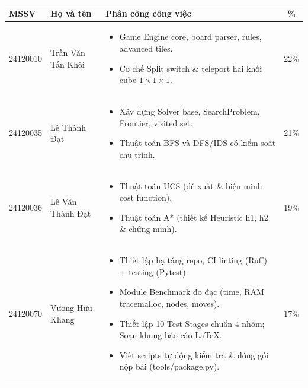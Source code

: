 \begin{table}[H]
    \centering
    \renewcommand{\arraystretch}{1.3}
    \setlength{\tabcolsep}{6pt}
    \setlength{\arrayrulewidth}{1pt}

    \begin{tabularx}{\textwidth}{|p{2cm}|p{4cm}|X|c|}
        \hline
        \rowcolor[rgb]{0.8, 0.9, 1.0}
        \textbf{MSSV} & \textbf{Họ và tên} & \textbf{Phân công công việc} & \textbf{\%} \\ \hline

        24120010 & Trần Văn Tấn Khôi &
        \vspace{-0.5\baselineskip}
        \begin{itemize}[itemsep=0pt, topsep=0pt, partopsep=0pt, parsep=0pt]
            \item Game Engine core, board parser, rules, advanced tiles.
            \item Cơ chế Split switch \& teleport hai khối cube $1 \times 1 \times 1$.
        \end{itemize} & 22\% \\ \hline

        24120035 & Lê Thành Đạt & 
        \vspace{-0.5\baselineskip}
        \begin{itemize}[itemsep=0pt, topsep=0pt, partopsep=0pt, parsep=0pt]
            \item Xây dựng Solver base, SearchProblem, Frontier, visited set.
            \item Thuật toán BFS và DFS/IDS có kiểm soát chu trình.
        \end{itemize} & 21\% \\ \hline

        24120036 & Lê Văn Thành Đạt & 
        \vspace{-0.5\baselineskip}
        \begin{itemize}[itemsep=0pt, topsep=0pt, partopsep=0pt, parsep=0pt]
            \item Thuật toán UCS (đề xuất \& biện minh cost function).
            \item Thuật toán A* (thiết kế Heuristic h1, h2 \& chứng minh).
        \end{itemize} & 19\% \\ \hline

        24120070 & Vương Hữu Khang &
        \vspace{-0.5\baselineskip}
        \begin{itemize}[itemsep=0pt, topsep=0pt, partopsep=0pt, parsep=0pt]
            \item Thiết lập hạ tầng repo, CI linting (Ruff) + testing (Pytest).
            \item Module Benchmark đo đạc (time, RAM tracemalloc, nodes, moves).
            \item Thiết lập 10 Test Stages chuẩn 4 nhóm; Soạn khung báo cáo LaTeX.
            \item Viết scripts tự động kiểm tra \& đóng gói nộp bài (tools/package.py).
        \end{itemize} & 17\% \\ \hline


\end{tabularx}
\end{table}
